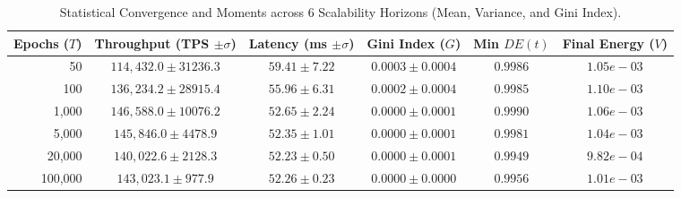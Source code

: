 \begin{table}[t]
\centering
\small
\caption{Statistical Convergence and Moments across 6 Scalability Horizons (Mean, Variance, and Gini Index).}
\label{tab:scale_convergence}
\begin{tabular}{rccccc}
\hline\hline
Epochs ($T$) & Throughput (TPS $\pm \sigma$) & Latency (ms $\pm \sigma$) & Gini Index ($G$) & Min $DE(t)$ & Final Energy ($V$) \\ \hline
50 & $114,432.0 \pm 31236.3$ & $59.41 \pm 7.22$ & $0.0003 \pm 0.0004$ & $0.9986$ & $1.05e-03$ \\
100 & $136,234.2 \pm 28915.4$ & $55.96 \pm 6.31$ & $0.0002 \pm 0.0004$ & $0.9985$ & $1.10e-03$ \\
1,000 & $146,588.0 \pm 10076.2$ & $52.65 \pm 2.24$ & $0.0000 \pm 0.0001$ & $0.9990$ & $1.06e-03$ \\
5,000 & $145,846.0 \pm 4478.9$ & $52.35 \pm 1.01$ & $0.0000 \pm 0.0001$ & $0.9981$ & $1.04e-03$ \\
20,000 & $140,022.6 \pm 2128.3$ & $52.23 \pm 0.50$ & $0.0000 \pm 0.0001$ & $0.9949$ & $9.82e-04$ \\
100,000 & $143,023.1 \pm 977.9$ & $52.26 \pm 0.23$ & $0.0000 \pm 0.0000$ & $0.9956$ & $1.01e-03$ \\
\hline\hline
\end{tabular}
\end{table}
